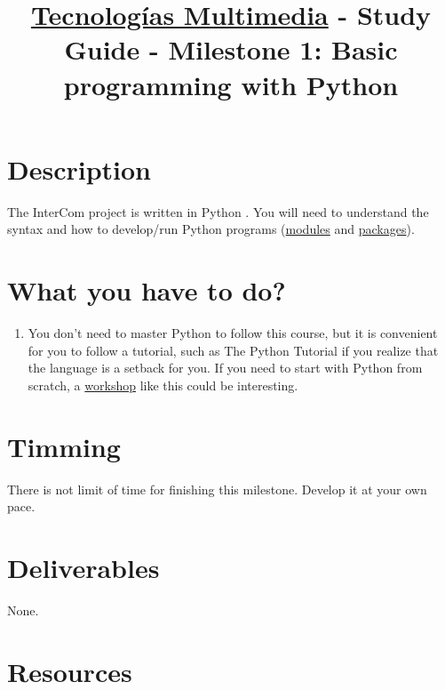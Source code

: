 \title{\href{https://www.ual.es/estudios/grados/presentacion/plandeestudios/asignatura/4015/40154321?idioma=zh_CN}{Tecnologías Multimedia} - Study Guide - Milestone 1: Basic programming with Python}

\maketitle

\section{Description}

The InterCom project \cite{intercom} is written in Python
\cite{Python}. You will need to understand the syntax and how to
develop/run Python programs
(\href{https://docs.python.org/3/tutorial/modules.html#modules}{modules}
and
\href{https://docs.python.org/3/tutorial/modules.html#packages}{packages}).

\section{What you have to do?}

\begin{enumerate}
\item You don't need to master Python to follow this course, but it is
  convenient for you to follow a tutorial, such as The Python
  Tutorial \cite{python-tutorial} if you realize that the language is
  a setback for you. If you need to start with Python from scratch,
  a \href{https://github.com/vicente-gonzalez-ruiz/YAPT/tree/master/workshops/programacion_python_ESO}{workshop} \cite{YAPT}
  like this could be interesting.
\end{enumerate}

\section{Timming}

There is not limit of time for finishing this milestone. Develop it at
your own pace.

\section{Deliverables}

None.

\section{Resources}



